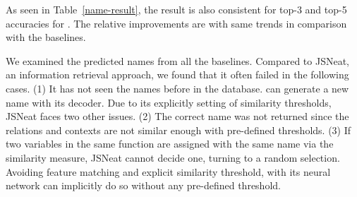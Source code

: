 %			

As seen in Table~\ref{name-result}, the result is also consistent for
top-3 and top-5 accuracies for {\tool}. The relative improvements are
with same trends in comparison with the baselines.

We examined the predicted names from all the baselines. Compared to
JSNeat, an information retrieval approach, we found that it often
failed in the following cases. (1) It has not seen the names before in
the database. {\tool} can generate a new name with its decoder. Due to its
explicitly setting of similarity thresholds, JSNeat faces two other
issues. (2) The correct name was not returned since the relations
and contexts are not similar enough with pre-defined thresholds.  (3)
If two variables in the same function are assigned with the same name
via the similarity measure, JSNeat cannot decide one, turning to a
random selection. Avoiding feature matching and explicit similarity
threshold, {\tool} with its neural network can implicitly do so
without any pre-defined threshold.

